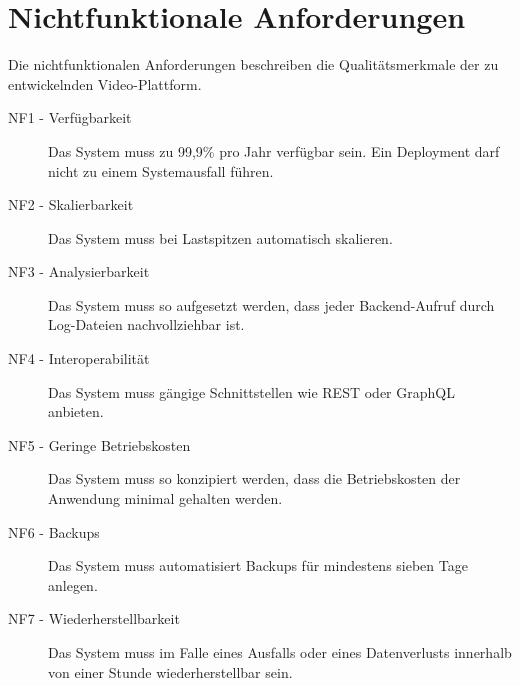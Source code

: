 \section{Nichtfunktionale Anforderungen}

Die nichtfunktionalen Anforderungen beschreiben die Qualitätsmerkmale der zu entwickelnden Video-Plattform.

\begin{description}
   \item[NF1 - Verfügbarkeit] Das System muss zu 99,9\% pro Jahr verfügbar sein. Ein Deployment darf nicht zu einem Systemausfall führen.\label{NF1}
   \item[NF2 - Skalierbarkeit] Das System muss bei Lastspitzen automatisch skalieren.\label{NF2}
   \item[NF3 - Analysierbarkeit] Das System muss so aufgesetzt werden, dass jeder Backend-Aufruf durch Log-Dateien nachvollziehbar ist.\label{NF3}
   \item[NF4 - Interoperabilität] Das System muss gängige Schnittstellen wie REST oder GraphQL anbieten.\label{NF4}
   \item[NF5 - Geringe Betriebskosten] Das System muss so konzipiert werden, dass die Betriebskosten der Anwendung minimal gehalten werden.\label{NF5}
   \item[NF6 - Backups] Das System muss automatisiert Backups für mindestens sieben Tage anlegen.\label{NF6}
   \item[NF7 - Wiederherstellbarkeit] Das System muss im Falle eines Ausfalls oder eines Datenverlusts innerhalb von einer Stunde wiederherstellbar sein.\label{NF7}
\end{description}